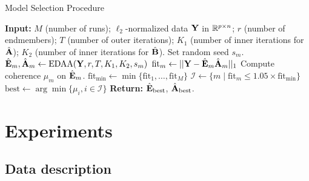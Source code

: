 \begin{algorithm}[h]
  \caption{Model Selection Procedure}\label{alg:criterion}
  \begin{algorithmic}[1]
    \State \textbf{Input:} $M$ (number of runs); $\ell_2$-normalized data $\mathbf Y$ in $\mathbb R^{p \times n}$; $r$ (number of
    endmembers); $T$ (number of outer iterations); $K_1$ (number of inner
    iterations for $\hat{\mathbf A}$); $K_2$ (number of inner iterations for $\hat{\mathbf B}$).
       \State Set random seed $s_m$.
       \State $\hat{\mathbf E}_m, \hat{\mathbf A}_m \gets \text{EDAA}(\mathbf Y, r, T, K_1, K_2, s_m)$ 
       \State $\text{fit}_m \gets ||\mathbf Y - \hat{\mathbf E}_m \hat{\mathbf A}_m||_1$
       \State Compute coherence $\mu_m$ on $\hat{\mathbf E}_m$.
    \EndFor
    \State $\text{fit}_{\min} \gets \min \{ \text{fit}_1, \ldots, \text{fit}_M \}$
    \State $\mathcal{I} \gets \{m \; | \; \text{fit}_m \leq 1.05 \times \text{fit}_{\min} \}$
    \State $\text{best} \gets \arg \min \{\mu_i, i \in \mathcal{I}\}$
    \State \textbf{Return:} $\hat{\mathbf E}_{\text{best}}$, $\hat{\mathbf A}_{\text{best}}$.
  \end{algorithmic}
\end{algorithm}

\section{Experiments}
\label{sec:EDAA_exp}


\subsection{Data description}

